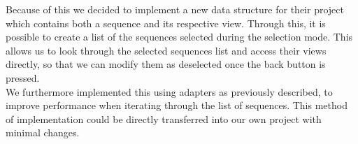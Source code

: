 Because of this we decided to implement a new data structure for their project which contains both a sequence and its respective view. Through this, it is possible to create a list of the sequences selected during the selection mode. This allows us to look through the selected sequences list and access their views directly, so that we can modify them as deselected once the back button is pressed. \\
 
We furthermore implemented this using adapters as previously described, to improve performance when iterating through the list of sequences. This method of implementation could be directly transferred into our own project with minimal changes. \\